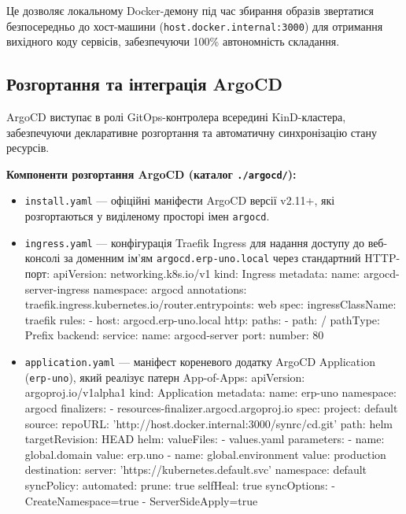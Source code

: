 \documentclass[12pt,a4paper]{article}
\let\originalfootnotesize\footnotesize
\let\oldverbatim\verbatim
\let\oldendverbatim\endverbatim
\renewenvironment{verbatim}{\originalfootnotesize\oldverbatim}{\oldendverbatim}
\begin{document}
Це дозволяє локальному Docker-демону під час збирання образів звертатися безпосередньо до хост-машини (\texttt{host.docker.internal:3000}) для отримання вихідного коду сервісів, забезпечуючи 100\% автономність складання.

\subsection{Розгортання та інтеграція ArgoCD}

ArgoCD виступає в ролі GitOps-контролера всередині KinD-кластера, забезпечуючи декларативне розгортання та автоматичну синхронізацію стану ресурсів.

\textbf{Компоненти розгортання ArgoCD (каталог \texttt{./argocd/}):}
\begin{itemize}
    \item \texttt{install.yaml} --- офіційні маніфести ArgoCD версії v2.11+, які розгортаються у виділеному просторі імен \texttt{argocd}.
    \item \texttt{ingress.yaml} --- конфігурація Traefik Ingress для надання доступу до веб-консолі за доменним ім'ям \texttt{argocd.erp-uno.local} через стандартний HTTP-порт:
\begin{verbatim}
apiVersion: networking.k8s.io/v1
kind: Ingress
metadata:
  name: argocd-server-ingress
  namespace: argocd
  annotations:
    traefik.ingress.kubernetes.io/router.entrypoints: web
spec:
  ingressClassName: traefik
  rules:
  - host: argocd.erp-uno.local
    http:
      paths:
      - path: /
        pathType: Prefix
        backend:
          service:
            name: argocd-server
            port:
              number: 80
\end{verbatim}
    \item \texttt{application.yaml} --- маніфест кореневого додатку ArgoCD Application (\texttt{erp-uno}), який реалізує патерн \guillemotleft App-of-Apps\guillemotright:
\begin{verbatim}
apiVersion: argoproj.io/v1alpha1
kind: Application
metadata:
  name: erp-uno
  namespace: argocd
  finalizers:
    - resources-finalizer.argocd.argoproj.io
spec:
  project: default
  source:
    repoURL: 'http://host.docker.internal:3000/synrc/cd.git'
    path: helm
    targetRevision: HEAD
    helm:
      valueFiles:
        - values.yaml
      parameters:
        - name: global.domain
          value: erp.uno
        - name: global.environment
          value: production
  destination:
    server: 'https://kubernetes.default.svc'
    namespace: default
  syncPolicy:
    automated:
      prune: true
      selfHeal: true
    syncOptions:
      - CreateNamespace=true
      - ServerSideApply=true
\end{verbatim}
\end{itemize}
\end{document}
